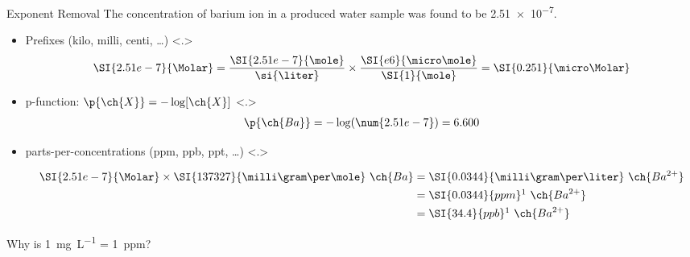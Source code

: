 \documentclass[notes=only]{beamer}
\begin{document}
\begin{frame}[t]{Exponent Removal}
	The concentration of barium ion in a produced water sample was found to
	be \SI{2.51e-7}{\Molar}.

	\begin{itemize}[<+->]
		\item Prefixes (kilo, milli, centi, \ldots)
			\only<.>{%
				\begin{align*}
					\SI{2.51e-7}{\Molar} =
					\dfrac{\SI{2.51e-7}{\mole}}{\si{\liter}}
					\times
					\dfrac{\SI{e6}{\micro\mole}}{\SI{1}{\mole}} =
					\SI{0.251}{\micro\Molar}
				\end{align*}
			}
		\item p-function: $\p{\ch{X}} = -\log [\ch{X}]$
			\only<.>{%
				\begin{align*}
					\p{\ch{Ba}} = -\log(\num{2.51e-7}) = 6.600
				\end{align*}
			}
		\item parts-per-concentrations (ppm, ppb, ppt, \ldots)
			\only<.>{%
				\begin{align*}
					\SI{2.51e-7}{\Molar} \times
					\SI{137327}{\milli\gram\per\mole}~\ch{Ba} &=
					\SI{0.0344}{\milli\gram\per\liter}~\ch{Ba^{2+}}
					\\
					&= \SI{0.0344}{ppm}\footnotemark[1]~\ch{Ba^{2+}} \\
					&= \SI{34.4}{ppb}\footnotemark[1]~\ch{Ba^{2+}}
				\end{align*}

				\bigskip
			}
	\end{itemize}
\end{frame}

\begin{frame}{Why is \SI{1}{\milli\gram\per\liter} = \SI{1}{ppm}?}


\end{frame}
\end{document}

